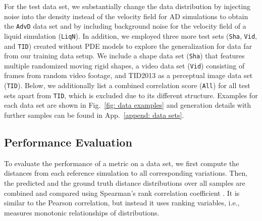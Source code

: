 \documentclass{article}
\begin{document}
For the test data set, we substantially change the data distribution by injecting noise into the density instead of the velocity field for AD simulations to obtain the \texttt{AdvD} data set and by including background noise for the velocity field of a liquid simulation (\texttt{LiqN}). In addition, we employed three more test sets (\texttt{Sha}, \texttt{Vid}, and \texttt{TID}) created without PDE models to explore the generalization for data far from our training data setup.
We include a shape data set (\texttt{Sha}) that features multiple randomized moving rigid shapes, a video data set (\texttt{Vid}) consisting of frames from random video footage, and TID2013 \citep{ponomarenko2015} as a perceptual image data set (\texttt{TID}).
Below, we additionally list a combined correlation score (\texttt{All}) for all test sets apart from \texttt{TID}, which is excluded due to its different structure. Examples for each data set are shown in Fig.~\ref{fig: data examples} and generation details with further samples can be found in App.~\ref{append: data sets}. 


\subsection{Performance Evaluation} \label{subsec: evaluation}
To evaluate the performance of a metric on a data set, we first compute the distances from each reference simulation to all corresponding variations. Then, the predicted and the ground truth distance distributions over all samples are combined and compared using Spearman's rank correlation coefficient \citep[see][]{spearman1904}. It is similar to the Pearson correlation, but instead it uses ranking variables, i.e., measures monotonic relationships of distributions.
\end{document}
